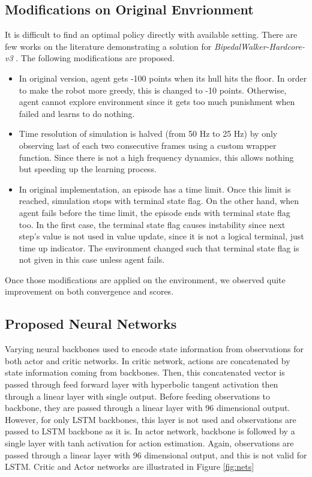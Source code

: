 \documentclass[a4paper, 12pt]{article} %
\begin{document}
\subsection{Modifications on Original Envrionment}

It is difficult to find an optimal policy directly with available setting. 
There are few works on the literature demonstrating a solution for \textit{BipedalWalker-Hardcore-v3} . 
The following modifications are proposed.

\begin{itemize}
	\item In original version, agent gets -100 points when its hull hits the floor. 
	In order to make the robot more greedy, this is changed to -10 points. 
	Otherwise, agent cannot explore environment since it gets too much punishment when failed and learns to do nothing.
	\item Time resolution of simulation is halved (from 50 Hz to 25 Hz) by only observing last of each two consecutive frames using a custom wrapper function. 
	Since there is not a high frequency dynamics, this allows nothing but speeding up the learning process.
	\item In original implementation, an episode has a time limit. 
	Once this limit is reached, simulation stops with terminal state flag. 
	On the other hand, when agent fails before the time limit, the episode ends with terminal state flag too. 
	In the first case, the terminal state flag causes instability since next step's value is not used in value update, since it is not a logical terminal, just time up indicator.
	The environment changed such that terminal state flag is not given in this case unless agent fails. 
\end{itemize}

Once those modifications are applied on the environment, we observed quite improvement on both convergence and scores. 

\subsection{Proposed Neural Networks}
\label{sec:proposed_networks}

Varying neural backbones used to encode state information from observations for both actor and critic networks. 
In critic network, actions are concatenated by state information coming from backbones. 
Then, this concatenated vector is passed through feed forward layer with hyperbolic tangent activation then through a linear layer with single output. 
Before feeding observations to backbone, they are passed through a linear layer with 96 dimensional output. 
However, for only LSTM backbones, this layer is not used and observations are passed to LSTM backbone as it is. 
In actor network, backbone is followed by a single layer with tanh activation for action estimation. 
Again, observations are passed through a linear layer with 96 dimensional output, and this is not valid for LSTM.
Critic and Actor networks are illustrated in Figure \ref{fig:nets} 
\end{document}

